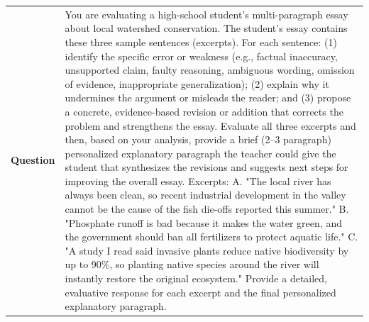 \begin{longtable}{@{}l p{12.5cm}@{}}
  \textbf{Question} & You are evaluating a high-school student's multi-paragraph essay about local watershed conservation. The student's essay contains these three sample sentences (excerpts). For each sentence: (1) identify the specific error or weakness (e.g., factual inaccuracy, unsupported claim, faulty reasoning, ambiguous wording, omission of evidence, inappropriate generalization); (2) explain why it undermines the argument or misleads the reader; and (3) propose a concrete, evidence-based revision or addition that corrects the problem and strengthens the essay. Evaluate all three excerpts and then, based on your analysis, provide a brief (2--3 paragraph) personalized explanatory paragraph the teacher could give the student that synthesizes the revisions and suggests next steps for improving the overall essay. \newline Excerpts: \newline A. "The local river has always been clean, so recent industrial development in the valley cannot be the cause of the fish die-offs reported this summer." \newline B. "Phosphate runoff is bad because it makes the water green, and the government should ban all fertilizers to protect aquatic life." \newline C. "A study I read said invasive plants reduce native biodiversity by up to 90\%, so planting native species around the river will instantly restore the original ecosystem." \newline Provide a detailed, evaluative response for each excerpt and the final personalized explanatory paragraph. \\

\end{longtable}
